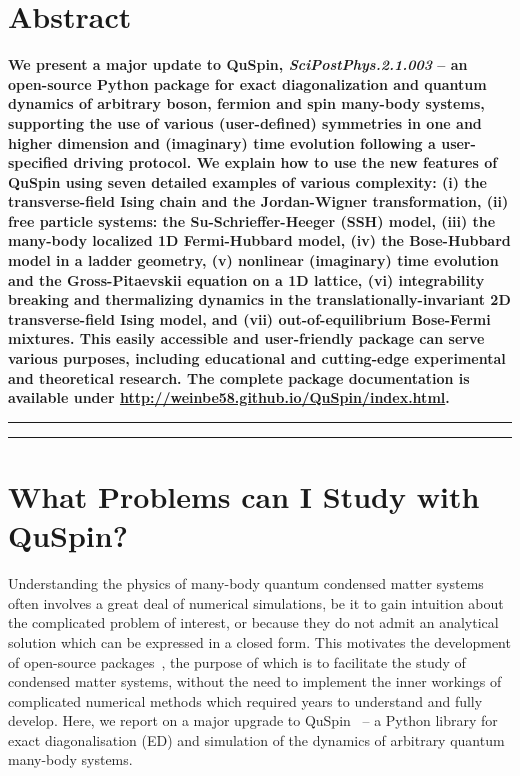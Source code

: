 \documentclass{SciPost}
\newcommand\0{\scalebox{-1}[1]{0}}
\begin{document}
\section*{Abstract}
{\bf 
We present a major update to QuSpin, \emph{SciPostPhys.2.1.003} -- an open-source Python package for exact diagonalization and quantum dynamics of arbitrary boson, fermion and spin many-body systems, supporting the use of various (user-defined) symmetries in one and higher dimension and (imaginary) time evolution following a user-specified driving protocol. We explain how to use the new features of QuSpin using seven detailed examples of various complexity: (i) the transverse-field Ising chain and the Jordan-Wigner transformation, (ii) free particle systems: the Su-Schrieffer-Heeger (SSH) model, (iii) the many-body localized 1D Fermi-Hubbard model, (iv) the Bose-Hubbard model in a ladder geometry, (v) nonlinear (imaginary) time evolution and the Gross-Pitaevskii equation on a 1D lattice, (vi) integrability breaking and thermalizing dynamics in the translationally-invariant 2D transverse-field Ising model, and (vii) out-of-equilibrium Bose-Fermi mixtures. This easily accessible and user-friendly package can serve various purposes, including educational and cutting-edge experimental and theoretical research. The complete package documentation is available under \href{http://weinbe58.github.io/QuSpin/index.html}{http://weinbe58.github.io/QuSpin/index.html}.
}


\vspace{10pt}
\noindent\rule{\textwidth}{1pt}
\tableofcontents\thispagestyle{fancy}
\noindent\rule{\textwidth}{1pt}
\vspace{10pt}


\section{What Problems can I Study with QuSpin?}
\label{sec:intro}


Understanding the physics of many-body quantum condensed matter systems often involves a great deal of numerical simulations, be it to gain intuition about the complicated problem of interest, or because they do not admit an analytical solution which can be expressed in a closed form. This motivates the development of open-source packages~\cite{alet05,albuquerque2007,bauer11,dolfi14,ITensor,TNT,johansson2012,johansson2013,wright_13,kramer_17,gegg_17,young_17,al_17}, the purpose of which is to facilitate the study of condensed matter systems, without the need to implement the inner workings of complicated numerical methods which required years to understand and fully develop. Here, we report on a major upgrade to QuSpin~\cite{weinberg_17_quspin} -- a Python library for exact diagonalisation (ED) and simulation of the dynamics of arbitrary quantum many-body systems. 
\end{document}
